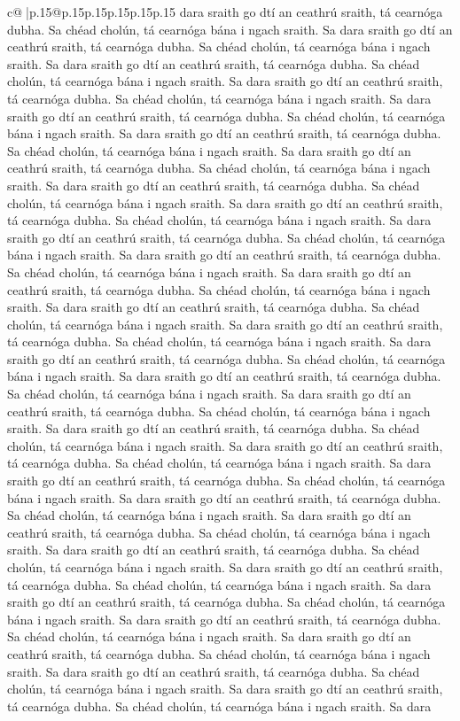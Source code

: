 \documentclass{article}
\begin{document}
{\begin{supertabular}{c@{$\;$}|p{.15\linewidth}@{}p{.15\linewidth}p{.15\linewidth}p{.15\linewidth}p{.15\linewidth}p{.15\linewidth}}
{{{dara sraith go dtí an ceathrú sraith, tá cearnóga dubha. Sa chéad cholún, tá cearnóga bána i ngach sraith. Sa dara sraith go dtí an ceathrú sraith, tá cearnóga dubha. Sa chéad cholún, tá cearnóga bána i ngach sraith. Sa dara sraith go dtí an ceathrú sraith, tá cearnóga dubha. Sa chéad cholún, tá cearnóga bána i ngach sraith. Sa dara sraith go dtí an ceathrú sraith, tá cearnóga dubha. Sa chéad cholún, tá cearnóga bána i ngach sraith. Sa dara sraith go dtí an ceathrú sraith, tá cearnóga dubha. Sa chéad cholún, tá cearnóga bána i ngach sraith. Sa dara sraith go dtí an ceathrú sraith, tá cearnóga dubha. Sa chéad cholún, tá cearnóga bána i ngach sraith. Sa dara sraith go dtí an ceathrú sraith, tá cearnóga dubha. Sa chéad cholún, tá cearnóga bána i ngach sraith. Sa dara sraith go dtí an ceathrú sraith, tá cearnóga dubha. Sa chéad cholún, tá cearnóga bána i ngach sraith. Sa dara sraith go dtí an ceathrú sraith, tá cearnóga dubha. Sa chéad cholún, tá cearnóga bána i ngach sraith. Sa dara sraith go dtí an ceathrú sraith, tá cearnóga dubha. Sa chéad cholún, tá cearnóga bána i ngach sraith. Sa dara sraith go dtí an ceathrú sraith, tá cearnóga dubha. Sa chéad cholún, tá cearnóga bána i ngach sraith. Sa dara sraith go dtí an ceathrú sraith, tá cearnóga dubha. Sa chéad cholún, tá cearnóga bána i ngach sraith. Sa dara sraith go dtí an ceathrú sraith, tá cearnóga dubha. Sa chéad cholún, tá cearnóga bána i ngach sraith. Sa dara sraith go dtí an ceathrú sraith, tá cearnóga dubha. Sa chéad cholún, tá cearnóga bána i ngach sraith. Sa dara sraith go dtí an ceathrú sraith, tá cearnóga dubha. Sa chéad cholún, tá cearnóga bána i ngach sraith. Sa dara sraith go dtí an ceathrú sraith, tá cearnóga dubha. Sa chéad cholún, tá cearnóga bána i ngach sraith. Sa dara sraith go dtí an ceathrú sraith, tá cearnóga dubha. Sa chéad cholún, tá cearnóga bána i ngach sraith. Sa dara sraith go dtí an ceathrú sraith, tá cearnóga dubha. Sa chéad cholún, tá cearnóga bána i ngach sraith. Sa dara sraith go dtí an ceathrú sraith, tá cearnóga dubha. Sa chéad cholún, tá cearnóga bána i ngach sraith. Sa dara sraith go dtí an ceathrú sraith, tá cearnóga dubha. Sa chéad cholún, tá cearnóga bána i ngach sraith. Sa dara sraith go dtí an ceathrú sraith, tá cearnóga dubha. Sa chéad cholún, tá cearnóga bána i ngach sraith. Sa dara sraith go dtí an ceathrú sraith, tá cearnóga dubha. Sa chéad cholún, tá cearnóga bána i ngach sraith. Sa dara sraith go dtí an ceathrú sraith, tá cearnóga dubha. Sa chéad cholún, tá cearnóga bána i ngach sraith. Sa dara sraith go dtí an ceathrú sraith, tá cearnóga dubha. Sa chéad cholún, tá cearnóga bána i ngach sraith. Sa dara sraith go dtí an ceathrú sraith, tá cearnóga dubha. Sa chéad cholún, tá cearnóga bána i ngach sraith. Sa dara sraith go dtí an ceathrú sraith, tá cearnóga dubha. Sa chéad cholún, tá cearnóga bána i ngach sraith. Sa dara sraith go dtí an ceathrú sraith, tá cearnóga dubha. Sa chéad cholún, tá cearnóga bána i ngach sraith. Sa dara sraith go dtí an ceathrú sraith, tá cearnóga dubha. Sa chéad cholún, tá cearnóga bána i ngach sraith. Sa dara sraith go dtí an ceathrú sraith, tá cearnóga dubha. Sa chéad cholún, tá cearnóga bána i ngach sraith. Sa dara }}}
\end{supertabular}}
\end{document}
